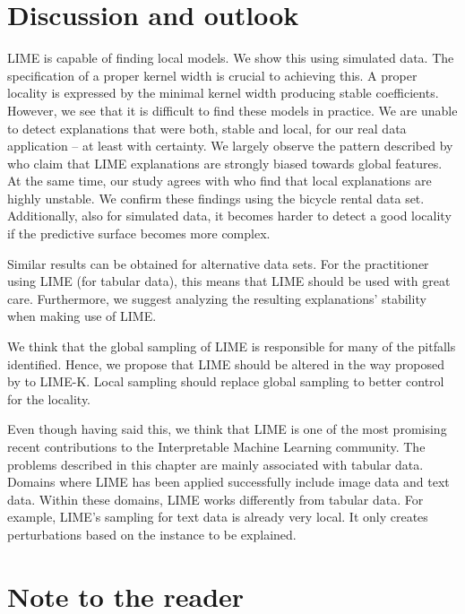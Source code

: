 \documentclass[]{krantz}
\begin{document}
\section{Discussion and outlook}\label{id5}

LIME is capable of finding local models. We show this using simulated
data. The specification of a proper kernel width is crucial to achieving
this. A proper locality is expressed by the minimal kernel width
producing stable coefficients. However, we see that it is difficult to
find these models in practice. We are unable to detect explanations that
were both, stable and local, for our real data application -- at least
with certainty. We largely observe the pattern described by
\citet{laugel2018defining} who claim that LIME explanations are strongly
biased towards global features. At the same time, our study agrees with
\citet{alvarez2018robustness} who find that local explanations are
highly unstable. We confirm these findings using the bicycle rental data
set. Additionally, also for simulated data, it becomes harder to detect
a good locality if the predictive surface becomes more complex.

Similar results can be obtained for alternative data sets. For the
practitioner using LIME (for tabular data), this means that LIME should
be used with great care. Furthermore, we suggest analyzing the resulting
explanations' stability when making use of LIME.

We think that the global sampling of LIME is responsible for many of the
pitfalls identified. Hence, we propose that LIME should be altered in
the way proposed by \citet{laugel2018defining} to LIME-K. Local sampling
should replace global sampling to better control for the locality.

Even though having said this, we think that LIME is one of the most
promising recent contributions to the Interpretable Machine Learning
community. The problems described in this chapter are mainly associated
with tabular data. Domains where LIME has been applied successfully
include image data and text data. Within these domains, LIME works
differently from tabular data. For example, LIME's sampling for text
data is already very local. It only creates perturbations based on the
instance to be explained.

\section{Note to the reader}\label{id6}
\end{document}
